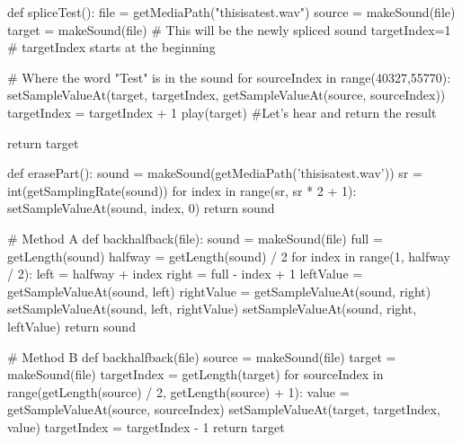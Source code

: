 \begin{exercises}
\begin{ex}
\begin{example}
def spliceTest():
    file = getMediaPath("thisisatest.wav")
    source = makeSound(file)
    target = makeSound(file)   # This will be the newly spliced sound
    targetIndex=1         # targetIndex starts at the beginning

    # Where the word "Test" is in the sound
    for sourceIndex in range(40327,55770):
        setSampleValueAt(target, targetIndex,
            getSampleValueAt(source, sourceIndex))
        targetIndex = targetIndex + 1
    play(target)          #Let's hear and return the result

    return target
\end{example}
\end{ex}

\begin{ex}
\begin{example}
def erasePart():
    sound = makeSound(getMediaPath('thisisatest.wav'))
    sr = int(getSamplingRate(sound))
    for index in range(sr, sr * 2 + 1):
        setSampleValueAt(sound, index, 0)
    return sound
\end{example}
\end{ex}

\begin{ex}
\begin{example}
# Method A
def backhalfback(file):
  sound = makeSound(file)
  full = getLength(sound)
  halfway = getLength(sound) / 2
  for index in range(1, halfway / 2):
    left = halfway + index
    right = full - index + 1
    leftValue = getSampleValueAt(sound, left)
    rightValue = getSampleValueAt(sound, right)
    setSampleValueAt(sound, left, rightValue)
    setSampleValueAt(sound, right, leftValue)
  return sound

# Method B
def backhalfback(file)
  source = makeSound(file)
  target = makeSound(file)
  targetIndex = getLength(target)
  for sourceIndex in range(getLength(source) / 2, getLength(source) + 1):
    value = getSampleValueAt(source, sourceIndex)
    setSampleValueAt(target, targetIndex, value)
    targetIndex = targetIndex - 1
  return target
\end{example}
\end{ex}

\end{exercises}
